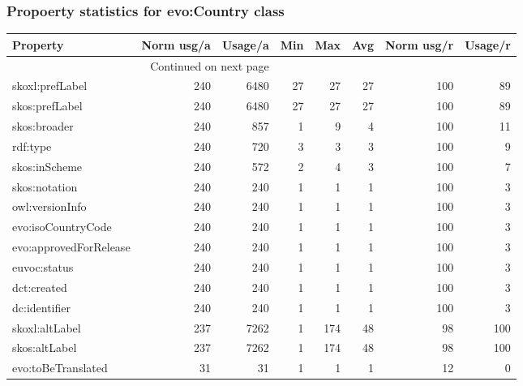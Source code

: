 \documentclass[10pt,a4paper,titlepage,final]{article}
\begin{document}
\subsubsection{Propoerty statistics for evo:Country class}
\begin{longtable}{lrrrrrrr}
\toprule
               Property &  Norm usg/a &  Usage/a &  Min &  Max &  Avg &  Norm usg/r &  Usage/r \\
\midrule
\endhead
\midrule
\multicolumn{3}{r}{{Continued on next page}} \\
\midrule
\endfoot

\bottomrule
\endlastfoot
        skoxl:prefLabel &         240 &     6480 &   27 &   27 &   27 &         100 &       89 \\
         skos:prefLabel &         240 &     6480 &   27 &   27 &   27 &         100 &       89 \\
           skos:broader &         240 &      857 &    1 &    9 &    4 &         100 &       11 \\
               rdf:type &         240 &      720 &    3 &    3 &    3 &         100 &        9 \\
          skos:inScheme &         240 &      572 &    2 &    4 &    3 &         100 &        7 \\
          skos:notation &         240 &      240 &    1 &    1 &    1 &         100 &        3 \\
        owl:versionInfo &         240 &      240 &    1 &    1 &    1 &         100 &        3 \\
     evo:isoCountryCode &         240 &      240 &    1 &    1 &    1 &         100 &        3 \\
 evo:approvedForRelease &         240 &      240 &    1 &    1 &    1 &         100 &        3 \\
           euvoc:status &         240 &      240 &    1 &    1 &    1 &         100 &        3 \\
            dct:created &         240 &      240 &    1 &    1 &    1 &         100 &        3 \\
          dc:identifier &         240 &      240 &    1 &    1 &    1 &         100 &        3 \\
         skoxl:altLabel &         237 &     7262 &    1 &  174 &   48 &          98 &      100 \\
          skos:altLabel &         237 &     7262 &    1 &  174 &   48 &          98 &      100 \\
     evo:toBeTranslated &          31 &       31 &    1 &    1 &    1 &          12 &        0 \\

\end{longtable}
\end{document}

